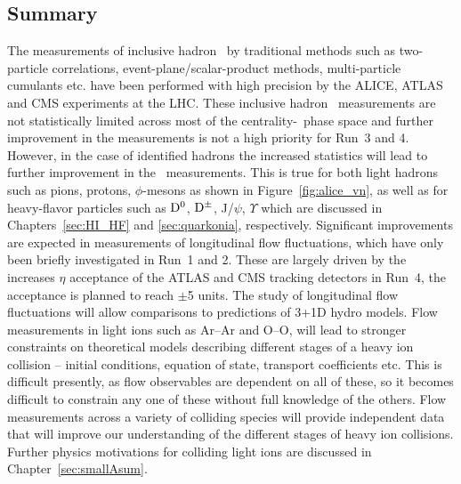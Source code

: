 \subsection{Summary}
The measurements of inclusive hadron \vn\ by traditional methods such as 
  two-particle correlations, event-plane/scalar-product methods, 
  multi-particle cumulants etc. have been performed with high precision 
  by the ALICE, ATLAS and CMS experiments at the LHC.
These inclusive hadron \vn\ measurements are not statistically limited 
  across most of the centrality-\pt\ phase space and further improvement 
  in the measurements is not a high priority for Run~3 and 4.
However, in the case of identified hadrons the increased statistics 
  will lead to further improvement in the \vn\ measurements.
This is true for both light hadrons such as pions, protons, $\phi$-mesons 
  as shown in Figure~\ref{fig:alice_vn}, as well as for heavy-flavor 
  particles such as $\rm D^0$, $\rm D^{\pm}$, J/$\psi$, $\Upsilon$ which are 
  discussed in Chapters~\ref{sec:HI_HF} and \ref{sec:quarkonia}, respectively.
%
Significant improvements are expected in measurements of 
  longitudinal flow fluctuations, which have only been briefly investigated
  in Run~1 and 2.
These are largely driven by the increases $\eta$ acceptance of the
  ATLAS and CMS tracking detectors in Run~4, the acceptance is planned 
  to reach $\pm$5 units.
The study of longitudinal flow fluctuations will allow comparisons to predictions 
  of 3+1D hydro models.
%
Flow measurements in light ions such as Ar--Ar and O--O, will lead 
  to stronger constraints on theoretical models describing different 
  stages of a heavy ion collision 
  -- initial conditions, equation of state, transport coefficients etc.
This is difficult presently, as flow observables are dependent 
  on all of these, so it becomes difficult to constrain any one of these 
  without full knowledge of the others.
Flow measurements across a variety of colliding species will provide independent 
  data that will improve our understanding of the different 
  stages of heavy ion collisions.
Further physics motivations for colliding light ions are discussed in Chapter~\ref{sec:smallAsum}.

